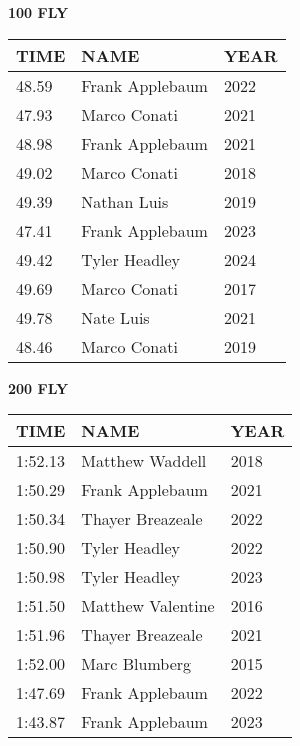 \begin{minipage}[t]{0.48\textwidth}
\centering
\textbf{100 FLY}\\[0.05cm]
\begin{tabular}{@{}p{1.8cm}p{2.8cm}p{1.2cm}@{}}
\hline
\textbf{TIME} & \textbf{NAME} & \textbf{YEAR} \\
\hline
48.59 & Frank Applebaum & 2022 \\
47.93 & Marco Conati & 2021 \\
48.98 & Frank Applebaum & 2021 \\
49.02 & Marco Conati & 2018 \\
49.39 & Nathan Luis & 2019 \\
47.41 & Frank Applebaum & 2023 \\
49.42 & Tyler Headley & 2024 \\
49.69 & Marco Conati & 2017 \\
49.78 & Nate Luis & 2021 \\
48.46 & Marco Conati & 2019 \\
\hline
\end{tabular}
\end{minipage}\hfill
\begin{minipage}[t]{0.48\textwidth}
\centering
\textbf{200 FLY}\\[0.05cm]
\begin{tabular}{@{}p{1.8cm}p{2.8cm}p{1.2cm}@{}}
\hline
\textbf{TIME} & \textbf{NAME} & \textbf{YEAR} \\
\hline
1:52.13 & Matthew Waddell & 2018 \\
1:50.29 & Frank Applebaum & 2021 \\
1:50.34 & Thayer Breazeale & 2022 \\
1:50.90 & Tyler Headley & 2022 \\
1:50.98 & Tyler Headley & 2023 \\
1:51.50 & Matthew Valentine & 2016 \\
1:51.96 & Thayer Breazeale & 2021 \\
1:52.00 & Marc Blumberg & 2015 \\
1:47.69 & Frank Applebaum & 2022 \\
1:43.87 & Frank Applebaum & 2023 \\
\hline
\end{tabular}
\end{minipage}

\vspace{0.4cm}

